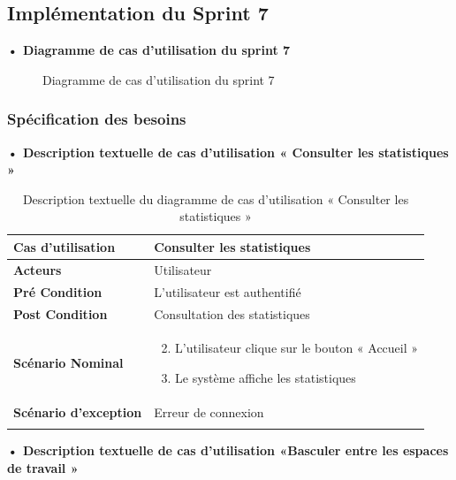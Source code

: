 \subsection{Implémentation du Sprint 7}
\textbf{•	Diagramme de cas d'utilisation du sprint 7}

\begin{figure}[H]
  \centering
  \caption{Diagramme de cas d'utilisation du sprint 7}
  \label{fig:UseCaseDiagramSp71}
\end{figure}

\subsubsection{Spécification des besoins}
\textbf{•	Description textuelle de cas d'utilisation « Consulter les statistiques »}

\begin{longtable}{|p{5cm}|p{10cm}|}
\hline
\textbf{Cas d'utilisation}&Consulter les statistiques\\
\hline
\textbf{Acteurs}&Utilisateur\\
\hline
\textbf{Pré Condition}&L'utilisateur est authentifié\\
\hline
\textbf{Post Condition}&Consultation des statistiques\\
\hline
\textbf{Scénario Nominal}&
\vspace{-\baselineskip}
\begin{enumerate}
  \setcounter{enumi}{1}
      \item L'utilisateur clique sur le bouton « Accueil »
      \item  Le système affiche les statistiques
\end{enumerate}\\
\hline
\textbf{Scénario d'exception}&Erreur de connexion\\
\hline
\caption{Description textuelle du diagramme de cas d'utilisation « Consulter les statistiques »}
\label{tab:use_case_consulter_statistiques}
\end{longtable}

\textbf{•	Description textuelle de cas d'utilisation «Basculer entre les espaces de travail »}

